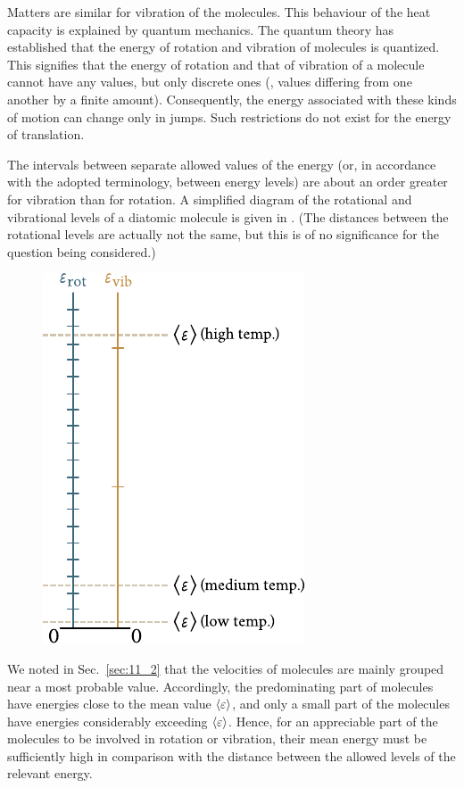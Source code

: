 Matters are similar for vibration of the molecules. This behaviour of the heat capacity is explained by quantum mechanics. The quantum theory has established that the energy of rotation and vibration of molecules is quantized. This signifies that the energy of rotation and that of vibration of a molecule cannot have any values, but only discrete ones (\ie, values differing from one another by a finite amount). Consequently, the energy associated with these kinds of motion can change only in jumps. Such restrictions do not exist for the energy of translation.

The intervals between separate allowed values of the energy (or, in accordance with the adopted terminology, between energy levels) are about an order greater for vibration than for rotation. A simplified diagram of the rotational and vibrational levels of a diatomic molecule is given in . (The distances between the rotational levels are actually not the same, but this is of no significance for the question being considered.)

\begin{figure}[t]
	\begin{center}
		\includegraphics[scale=1.0]{figures/ch_11/fig_11_14.pdf}
		\caption[]{}
		\label{fig:11_14}
	\end{center}
	\vspace{-0.8cm}
\end{figure}

We noted in Sec.~\ref{sec:11_2} that the velocities of molecules are mainly grouped near a most probable value. Accordingly, the predominating part of molecules have energies close to the mean value $\left\langle \varepsilon \right\rangle$, and only a small part of the molecules have energies considerably exceeding $\left\langle \varepsilon \right\rangle$. Hence, for an appreciable part of the molecules to be involved in rotation or vibration, their mean energy must be sufficiently high in comparison with the distance between the allowed levels of the relevant energy.

